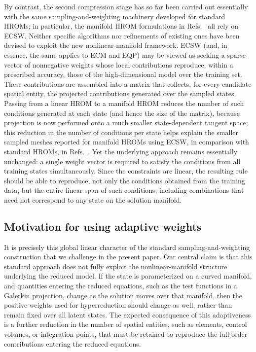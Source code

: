 \documentclass[preprint,10pt]{elsarticle}  %
\begin{document}
 By contrast, the second compression stage has so far been carried out
essentially with the same sampling-and-weighting machinery developed
for standard HROMs; in particular, the manifold HROM formulations in
Refs.~\cite{jain2019hyper,barnett2023neural,chmiel2025unified,
ares2026nonlinear} all rely on ECSW. Neither specific algorithms nor
refinements of existing ones have been devised to exploit the new
nonlinear-manifold framework. ECSW (and, in essence, the same applies to ECM and EQP) may be
viewed as seeking a sparse vector of nonnegative weights whose local
contributions reproduce, within a prescribed accuracy, those of the
high-dimensional model over the training set. These contributions are
assembled into a matrix that collects, for every candidate spatial
entity, the projected contributions generated over the sampled states.    Passing from a linear HROM
to a manifold HROM reduces the number of such conditions generated at
each state (and hence the size of the matrix), because projection is now performed onto a much smaller
state-dependent tangent space; this reduction in the number of
conditions per state helps explain the smaller sampled meshes reported
for manifold HROMs using ECSW, in comparison with standard HROMs, in
Refs.~\cite{jain2019hyper,barnett2023neural,ares2026nonlinear,
chmiel2025unified}.
Yet the underlying approach remains essentially unchanged: a
single weight vector is required to satisfy the conditions from all
training states simultaneously. Since the constraints are linear,  the resulting rule should be able to reproduce, not only the conditions obtained from the training data, but the entire linear span of such conditions, including combinations that need not correspond to any state on the solution manifold.

\subsection{Motivation for using adaptive weights}
 It is precisely this global linear character of the standard
sampling-and-weighting construction that we challenge in the present paper.
 Our central claim is that this standard approach does not fully exploit the
nonlinear-manifold structure underlying the reduced model.
 If the state is parameterized on a curved manifold, and
quantities entering the reduced equations, such as the test functions
in a Galerkin projection, change as the solution moves over that
manifold, then the positive weights used for hyperreduction should
change as well, rather than remain fixed over all latent states. The
expected consequence of this adaptiveness is a further reduction in
the number of spatial entities, such as elements, control volumes, or
integration points, that must be retained to reproduce the
full-order contributions entering the reduced equations.
\end{document}
